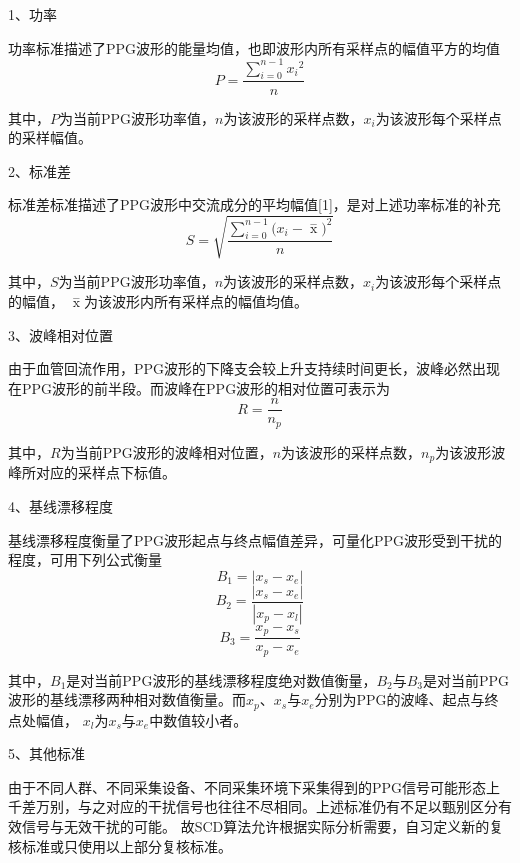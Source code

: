 1、功率

功率标准描述了PPG波形的能量均值，也即波形内所有采样点的幅值平方的均值
\begin{equation}
    \label{equ:ppgp}
    P=\frac{\sum_{i=0}^{n-1}{x_i}^2}{n}
\end{equation}

其中，$P$为当前PPG波形功率值，$n$为该波形的采样点数，$x_i$为该波形每个采样点的采样幅值。

2、标准差

标准差标准描述了PPG波形中交流成分的平均幅值[1]，是对上述功率标准的补充
\begin{equation}
    \label{equ:ppgstd}
    S=\sqrt{\frac{\sum_{i=0}^{n-1}{(x_i-\mathop{x} \limits^-})^2}{n}}
\end{equation}

其中，$S$为当前PPG波形功率值，$n$为该波形的采样点数，$x_i$为该波形每个采样点的幅值， $\mathop{x} \limits^-$为该波形内所有采样点的幅值均值。

3、波峰相对位置 

由于血管回流作用，PPG波形的下降支会较上升支持续时间更长，波峰必然出现在PPG波形的前半段。而波峰在PPG波形的相对位置可表示为
\begin{equation}
    \label{equ:rpeak}
    R = \frac{n}{n_p}
\end{equation}

其中，$R$为当前PPG波形的波峰相对位置，$n$为该波形的采样点数，$n_p$为该波形波峰所对应的采样点下标值。

4、基线漂移程度 

基线漂移程度衡量了PPG波形起点与终点幅值差异，可量化PPG波形受到干扰的程度，可用下列公式衡量
\begin{equation}
    \label{equ:b1}
    B_1 = |x_s-x_e|
\end{equation}
\begin{equation}
    \label{equ:b2}
    B_2 = \frac{|x_s-x_e|}{|x_p-x_l|}
\end{equation}
\begin{equation}
    \label{equ:b3}
    B_3 = \frac{x_p-x_s}{x_p-x_e}
\end{equation}

其中，$B_1$是对当前PPG波形的基线漂移程度绝对数值衡量，$B_2$与$B_3$是对当前PPG波形的基线漂移两种相对数值衡量。而$x_p$、$x_s$与$x_e$分别为PPG的波峰、起点与终点处幅值，
$x_l$为$x_s$与$x_e$中数值较小者。

5、其他标准

由于不同人群、不同采集设备、不同采集环境下采集得到的PPG信号可能形态上千差万别，与之对应的干扰信号也往往不尽相同。上述标准仍有不足以甄别区分有效信号与无效干扰的可能。
故SCD算法允许根据实际分析需要，自习定义新的复核标准或只使用以上部分复核标准。

